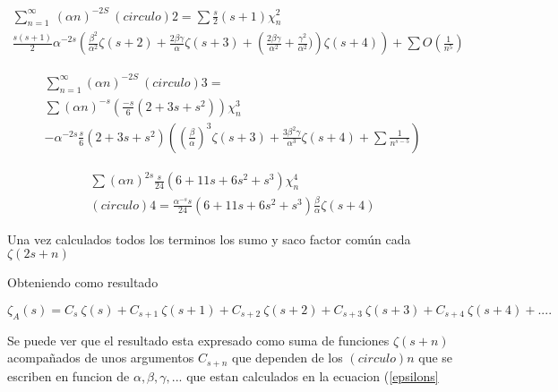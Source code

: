 \begin{equation}
\begin{array}{cc}
    \sum _{n=1} ^{\infty} \
    ( \alpha n ) ^{-2 S} \
    (circulo){2} = \sum \frac{s}{2} (s+1) \chi _n ^2 \\
    \frac{s(s+1)}{2} \alpha ^{-2s} \left(
    \frac{\beta ^2}{\alpha ^2} \zeta (s+2) +
    \frac{2 \beta \gamma}{\alpha} \zeta (s+3) + 
    \left(\frac{2 \beta \gamma}{\alpha ^2} + \frac{\gamma ^2}{\alpha ^2} ) \right)
    \zeta (s+4)
    \right ) + 
    \sum O(\frac{1}{n ^5 } )
\end{array}
\end{equation}

\begin{equation}
\begin{array}{c}
    \sum _{n=1} ^{\infty}
    ( \alpha n ) ^{-2 S} \
    (circulo){3} = \\ 
    \sum (\alpha n) ^{-s} (\frac{-s}{6} (2 + 3s + s^2 ) ) \chi _n ^3 \\
    -\alpha ^{-2 s} \frac{s}{6} (2+3 s + s^2) \left(
    ( \frac{\beta}{\alpha} ) ^3 \zeta (s+3) + 
    \frac{3 \beta ^2 \gamma}{\alpha ^3} \zeta (s+4) +
    \sum \frac{1}{n ^{s-5}}
    \right)
\end{array}
\end{equation}

\begin{equation}
\begin{array}{cc}
    \sum (\alpha n) ^{2 s} \frac{s}{24} (6 + 11s+ 6s^2 + s^3) \chi _n ^4 \\
    (circulo){4} = \frac{\alpha ^{-s} s}{24} (6+11s+6 s ^2 + s^3) 
    \frac{\beta}{\alpha} \zeta (s+4)
\end{array}
\end{equation}

Una vez calculados todos los terminos los sumo y saco factor común cada $\zeta( 2s+n )$


Obteniendo como resultado 

\begin{equation}
    \zeta _A (s) = 
    C _s \ \zeta (s) +
    C _{s+1} \ \zeta (s+1) + 
    C _{s+2} \ \zeta (s+2) +
    C _{s+3} \ \zeta (s+3) + 
    C _{s+4} \ \zeta (s+4) + ....
\end{equation}

Se puede ver que el resultado esta expresado como suma de funciones $\zeta (s+n)$ acompañados de unos argumentos $C_{s+n}$ que dependen de los $(circulo){n}$ que se escriben en funcion de $\alpha,\beta,\gamma, ...$ que estan calculados en la ecuacion (\ref{epsilons}

